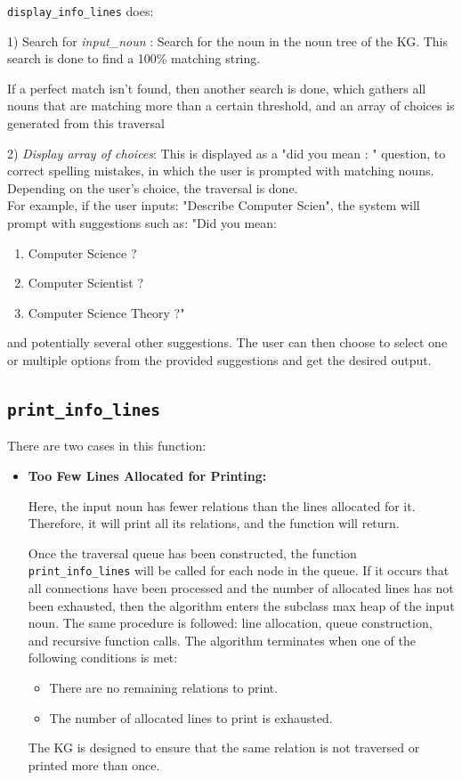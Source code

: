 \documentclass[conference]{IEEEtran}
\begin{document}
\texttt{display\_info\_lines} does:

1) Search for \textit{input\_noun} : Search for the noun in the noun tree of the KG. This search is done to find a 100\% matching string.

If a perfect match isn't found, then another search is done, which gathers all nouns that are matching more than a certain threshold, and an array of choices is generated from this traversal

2) \textit{Display array of choices}: This is displayed as a "did you mean : " question, to correct spelling mistakes, in which the user is prompted with matching nouns. Depending on the user’s choice, the traversal is done.\\

For example, if the user inputs: "Describe Computer Scien", the system will prompt with suggestions such as:
"Did you mean:

\begin{enumerate}
    \item Computer Science ?
    \item Computer Scientist ?
    \item Computer Science Theory ?"
\end{enumerate}

and potentially several other suggestions.
The user can then choose to select one or multiple options from the provided suggestions and get the desired output.


\subsection{\textbf{\texttt{print\_info\_lines}}}
There are two cases in this function:

\begin{itemize}
    \item \textbf{Too Few Lines Allocated for Printing:}
    
    Here, the input noun has fewer relations than the lines allocated for it. Therefore, it will print all its relations, and the function will return. 
    
    Once the traversal queue has been constructed, the function \texttt{print\_info\_lines} will be called for each node in the queue. If it occurs that all connections have been processed and the number of allocated lines has not been exhausted, then the algorithm enters the subclass max heap of the input noun. The same procedure is followed: line allocation, queue construction, and recursive function calls. The algorithm terminates when one of the following conditions is met:
    \begin{itemize}
        \item There are no remaining relations to print.
        \item The number of allocated lines to print is exhausted.
    \end{itemize}
    
    The KG is designed to ensure that the same relation is not traversed or printed more than once.
\end{itemize}
\end{document}
